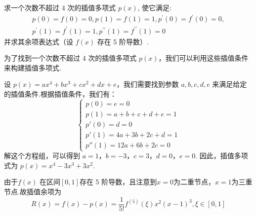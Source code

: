 \begin{tcolorbox}[breakable,
		colframe=white!10!jingga, coltitle=white!90!jingga, colback=white!95!jingga, coltext=black, colbacktitle=white!10!jingga, enhanced, fonttitle=\bfseries,fontupper=\normalsize, attach boxed title to top left={yshift=-2mm}, before skip=8pt, after skip=8pt,
		title=解答题]
 



求一个次数不超过 4 次的插值多项式 $ p(x) $, 使它满足:
$$
\begin{array}{l}
p(0)=f(0)=0, p(1)=f(1)=1, p^{\prime}(0)=f^{\prime}(0)=0, \\
p^{\prime}(1)=f^{\prime}(1)=1, p^{\prime \prime}(1)=f^{\prime \prime}(1)=0
\end{array}
$$
并求其余项表达式（设 $ f(x) $ 存在 5 阶导数）.
 \tcblower

为了找到一个次数不超过 4 次的插值多项式 $p(x)$，我们可以利用这些插值条件来构建插值多项式.

设 $p(x) = ax^4 + bx^3 + cx^2 + dx + e$，我们需要找到参数 $a, b, c, d, e$ 来满足给定的插值条件.根据插值条件，我们有：
$$
\begin{cases}
p(0) = e = 0 \\
p(1) = a + b + c + d + e = 1 \\
p'(0) = d = 0 \\
p'(1) = 4a + 3b + 2c + d = 1 \\
p''(1) = 12a + 6b + 2c = 0
\end{cases}
$$
解这个方程组，可以得到 $a = 1$，$b = -3$，$c = 3$，$d = 0$，$e = 0$.
因此，插值多项式为 $p(x) = x^4 -3x^3 +3x^2$.

由于$ f(x) $ 在区间$[0,1]$存在 5 阶导数，且注意到$x=0$为二重节点，$x=1$为三重节点.故插值余项为
$$R(x) = f(x) - p(x)=\frac{1}{5 !} f^{(5)}(\xi) x^{2}(x-1)^{3}, \xi \in[0,1]$$


\end{tcolorbox}


